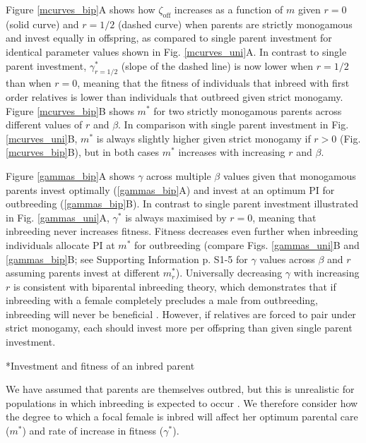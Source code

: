 \documentclass[12pt]{article}
\makeatletter
\renewcommand\subsection{\@startsection{subsection}{1}{-0.25in}{-0.5\baselineskip}{0.1\baselineskip}{\normalfont\normalsize\bfseries\textit}}
\makeatother
\begin{document}
Figure \ref{mcurves_bip}A shows how $\zeta_{\textrm{off}}$ increases as a function of $m$ given $r=0$ (solid curve) and $r=1/2$ (dashed curve) when parents are strictly monogamous and invest equally in offspring, as compared to single parent investment for identical parameter values shown in Fig. \ref{mcurves_uni}A. In contrast to single parent investment, $\gamma^{*}_{r=1/2}$ (slope of the dashed line) is now lower when $r=1/2$ than when $r=0$, meaning that the fitness of individuals that inbreed with first order relatives is lower than individuals that outbreed given strict monogamy. Figure \ref{mcurves_bip}B shows $m^{*}$ for two strictly monogamous parents across different values of $r$ and $\beta$. In comparison with single parent investment in Fig. \ref{mcurves_uni}B, $m^{*}$ is always slightly higher given strict monogamy if $r>0$ (Fig. \ref{mcurves_bip}B), but in both cases $m^{*}$ increases with increasing $r$ and $\beta$. 

Figure \ref{gammas_bip}A shows $\gamma$ across multiple $\beta$ values given that monogamous parents invest optimally (\ref{gammas_bip}A) and invest at an optimum PI for outbreeding (\ref{gammas_bip}B). In contrast to single parent investment illustrated in Fig. \ref{gammas_uni}A, $\gamma^{*}$ is always maximised by $r=0$, meaning that inbreeding never increases fitness. Fitness decreases even further when inbreeding individuals allocate PI at $m^{*}$ for outbreeding (compare Figs. \ref{gammas_uni}B and \ref{gammas_bip}B; see Supporting Information p. S1-5 for $\gamma$ values across $\beta$ and $r$ assuming parents invest at different $m^{*}_{r}$). Universally decreasing $\gamma$ with increasing $r$ is consistent with biparental inbreeding theory, which demonstrates that if inbreeding with a female completely precludes a male from outbreeding, inbreeding will never be beneficial \cite[][]{Waser1986, Duthie2015a}. However, if relatives are forced to pair under strict monogamy, each should invest more per offspring than given single parent investment.

\subsection*{Investment and fitness of an inbred parent}

We have assumed that parents are themselves outbred, but this is unrealistic for populations in which inbreeding is expected to occur \cite[][]{Duthie2015a}. We therefore consider how the degree to which a focal female is inbred will affect her optimum parental care ($m^{*}$) and rate of increase in fitness ($\gamma^{*}$).
\end{document}
